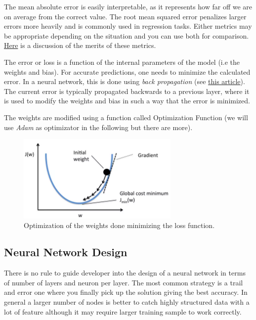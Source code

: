 The mean absolute error is easily interpretable, as it represents how
far off we are on average from the correct value. The root mean squared
error penalizes larger errors more heavily and is commonly used in
regression tasks. Either metrics may be appropriate depending on the
situation and you can use both for comparison.
\href{https://medium.com/human-in-a-machine-world/mae-and-rmse-which-metric-is-better-e60ac3bde13d}{Here}
is a discussion of the merits of these metrics.

The error or loss is a function of the internal parameters of the model
(i.e the weights and bias). For accurate predictions, one needs to
minimize the calculated error. In a neural network, this is done using
\emph{back propagation} (see
\href{https://towardsdatascience.com/understanding-backpropagation-algorithm-7bb3aa2f95fd}{this
	article}). The current error is typically propagated backwards to a
previous layer, where it is used to modify the weights and bias in such
a way that the error is minimized.

The weights are modified using a function called Optimization Function
(we will use \emph{Adam} as optimizator in the following but there are
more).

\begin{figure}[htb]
	\centering
	\includegraphics[width=0.7\textwidth]{figures/loss_function}
	\caption{Optimization of the weights done minimizing the loss function.}
\end{figure}

\subsection{Neural Network Design}\label{neural-network-design}

There is no rule to guide developer into the design of a neural network
in terms of number of layers and neuron per layer. The most common
strategy is a trail and error one where you finally pick up the solution
giving the best accuracy. In general a larger number of nodes is better
to catch highly structured data with a lot of feature although it may
require larger training sample to work correctly.

